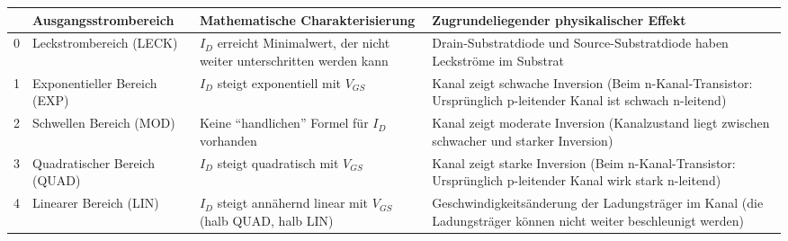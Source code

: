 \begin{tabular}{|lp{3cm}|p{6cm}|p{8cm}|}
	\hline
	& \textbf{Ausgangs\-strom\-bereich} & \textbf{Mathematische Charakterisierung} & \textbf{Zugrundeliegender physikalischer Effekt}
	\\ \hline
	\cellcolor{red!70}
	0 
	& Leckstrombereich (LECK) 
	& $I_D$ erreicht Minimalwert, der nicht weiter unterschritten werden kann
	& Drain-Substratdiode und Source-Substratdiode haben Leckströme im Substrat
	\\ \hline
	\cellcolor{orange!70}
	1
	& Exponentieller Bereich (EXP)
	& $I_D$ steigt exponentiell mit $V_{GS}$
	& Kanal zeigt schwache Inversion (Beim n-Kanal-Transistor: Ursprünglich p-leitender Kanal ist schwach n-leitend)
	\\ \hline
	\cellcolor{yellow!70}
	2
	& Schwellen Bereich (MOD)
	& Keine "`handlichen"' Formel für $I_D$ vorhanden
	& Kanal zeigt moderate Inversion (Kanalzustand liegt zwischen schwacher und starker Inversion)
	\\ \hline
	\cellcolor{green!70}
	3
	& Quadratischer Bereich (QUAD)
	& $I_D$ steigt quadratisch mit $V_{GS}$
	& Kanal zeigt starke Inversion (Beim n-Kanal-Transistor: Ursprünglich p-leitender Kanal wirk stark n-leitend)
	\\ \hline
	\cellcolor{blue!70}
	4
	& Linearer Bereich (LIN)
	& $I_D$ steigt annähernd linear mit $V_{GS}$ (halb QUAD, halb LIN)
	& Geschwindigkeitsänderung der Ladungsträger im Kanal (die Ladungsträger können nicht weiter beschleunigt werden)
	\\ \hline
\end{tabular}
\resetArrayStretch


